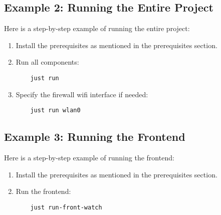 \documentclass{article}
\begin{document}
\subsection{Example 2: Running the Entire Project}
Here is a step-by-step example of running the entire project:
\begin{enumerate}
    \item Install the prerequisites as mentioned in the prerequisites section.
    \item Run all components:
    \begin{verbatim}
    just run
    \end{verbatim}
    \item Specify the firewall wifi interface if needed:
    \begin{verbatim}
    just run wlan0
    \end{verbatim}
\end{enumerate}

\subsection{Example 3: Running the Frontend}
Here is a step-by-step example of running the frontend:
\begin{enumerate}
    \item Install the prerequisites as mentioned in the prerequisites section.
    \item Run the frontend:
    \begin{verbatim}
    just run-front-watch
    \end{verbatim}
\end{enumerate}
\end{document}
